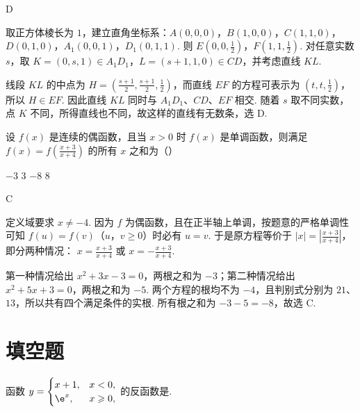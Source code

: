 \begin{answer}
D
\end{answer}

\begin{solution}
取正方体棱长为 \(1\)，建立直角坐标系：\(A(0,0,0)\)，\(B(1,0,0)\)，\(C(1,1,0)\)，\(D(0,1,0)\)，\(A_1(0,0,1)\)，\(D_1(0,1,1)\). 则
\(E(0,0,\frac{1}{2})\)，\(F(1,1,\frac{1}{2})\). 对任意实数 \(s\)，取
\(K=(0,s,1)\in A_1D_1\)，\(L=(s+1,1,0)\in CD\)，并考虑直线 \(KL\).

线段 \(KL\) 的中点为
\(H=(\frac{s+1}{2},\frac{s+1}{2},\frac{1}{2})\)，而直线 \(EF\) 的方程可表示为 \((t,t,\frac{1}{2})\)，所以 \(H\in EF\). 因此直线 \(KL\) 同时与 \(A_1D_1\)、\(CD\)、\(EF\) 相交. 随着 \(s\) 取不同实数，点 \(K\) 不同，所得直线也不同，故这样的直线有无数条，选 D.
\end{solution}

\begin{problem}
设 \( f(x) \) 是连续的偶函数，且当 \( x > 0 \) 时 \( f(x) \) 是单调函数，则满足 \( f(x) = f\left(\frac{x + 3}{x + 4}\right) \) 的所有 \( x \) 之和为（\quad）

\choices
    {\(-3\)}
    {3}
    {\(-8\)}
    {8}
\end{problem}

\begin{answer}
C
\end{answer}

\begin{solution}
定义域要求 \(x\neq-4\). 因为 \(f\) 为偶函数，且在正半轴上单调，按题意的严格单调性可知
\(f(u)=f(v)\)（\(u\)，\(v\geqslant0\)）时必有 \(u=v\). 于是原方程等价于
\(\left|x\right|=\left|\frac{x+3}{x+4}\right|\)，即分两种情况：
\(x=\frac{x+3}{x+4}\) 或 \(x=-\frac{x+3}{x+4}\).

第一种情况给出 \(x^2+3x-3=0\)，两根之和为 \(-3\)；第二种情况给出 \(x^2+5x+3=0\)，两根之和为 \(-5\). 两个方程的根均不为 \(-4\)，且判别式分别为 \(21\)、\(13\)，所以共有四个满足条件的实根. 所有根之和为 \(-3-5=-8\)，故选 C.
\end{solution}

\section{填空题}

\begin{problem}
函数 \( y = \begin{cases}
x + 1, & x < 0,\\
\e^x, & x \geqslant 0,
\end{cases} \) 的反函数是\fillinblank{}.
\end{problem}

